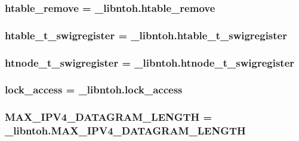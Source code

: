 \hypertarget{namespacelibntoh_a147903b845bcb7a8a2cef39995cd7771}{
\subsubsection[{htable\-\_\-remove}]{\setlength{\rightskip}{0pt plus 5cm}htable\-\_\-remove = \-\_\-libntoh.\-htable\-\_\-remove}}\label{namespacelibntoh_a147903b845bcb7a8a2cef39995cd7771}
\hypertarget{namespacelibntoh_aa5eb029a7e6bab4f20d15c66d6bc9d83}{
\subsubsection[{htable\-\_\-t\-\_\-swigregister}]{\setlength{\rightskip}{0pt plus 5cm}htable\-\_\-t\-\_\-swigregister = \-\_\-libntoh.\-htable\-\_\-t\-\_\-swigregister}}\label{namespacelibntoh_aa5eb029a7e6bab4f20d15c66d6bc9d83}
\hypertarget{namespacelibntoh_a94bf4991e947defd93cffe2e06e8167e}{
\subsubsection[{htnode\-\_\-t\-\_\-swigregister}]{\setlength{\rightskip}{0pt plus 5cm}htnode\-\_\-t\-\_\-swigregister = \-\_\-libntoh.\-htnode\-\_\-t\-\_\-swigregister}}\label{namespacelibntoh_a94bf4991e947defd93cffe2e06e8167e}
\hypertarget{namespacelibntoh_acccc2cbe471e1aea8452b88becf23df4}{
\subsubsection[{lock\-\_\-access}]{\setlength{\rightskip}{0pt plus 5cm}lock\-\_\-access = \-\_\-libntoh.\-lock\-\_\-access}}\label{namespacelibntoh_acccc2cbe471e1aea8452b88becf23df4}
\hypertarget{namespacelibntoh_a35b8888dbc65ac4b2037f649bbd726ef}{
\subsubsection[{M\-A\-X\-\_\-\-I\-P\-V4\-\_\-\-D\-A\-T\-A\-G\-R\-A\-M\-\_\-\-L\-E\-N\-G\-T\-H}]{\setlength{\rightskip}{0pt plus 5cm}M\-A\-X\-\_\-\-I\-P\-V4\-\_\-\-D\-A\-T\-A\-G\-R\-A\-M\-\_\-\-L\-E\-N\-G\-T\-H = \-\_\-libntoh.\-M\-A\-X\-\_\-\-I\-P\-V4\-\_\-\-D\-A\-T\-A\-G\-R\-A\-M\-\_\-\-L\-E\-N\-G\-T\-H}}\label{namespacelibntoh_a35b8888dbc65ac4b2037f649bbd726ef}
